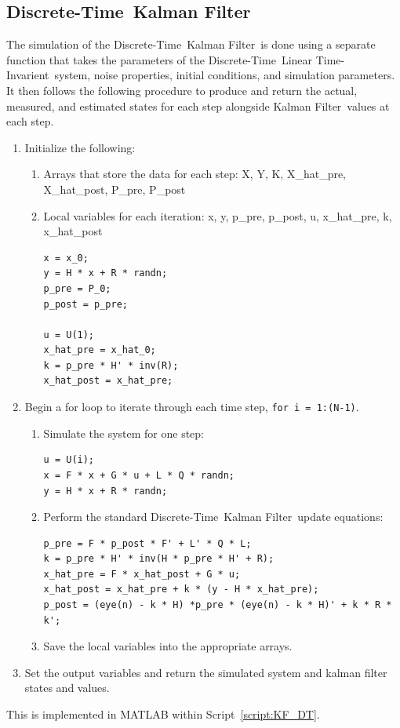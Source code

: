\documentclass[]{article}
\renewcommand{\lstlistingname}{Script}
\newcommand{\scriptname}{\lstlistingname}
\newcommand{\KF}{Kalman Filter}
\newcommand{\DT}{Discrete-Time}
\newcommand{\DTKF}{\DT \ \KF}
\newcommand{\LTI}{Linear Time-Invarient}
\begin{document}
	\subsection{\DTKF}\label{sec:DTKF}
		The simulation of the \DTKF \ is done using a separate function that takes the parameters of the \DT \ \LTI \ system, noise properties, initial conditions, and simulation parameters. It then follows the following procedure to produce and return the actual, measured, and estimated states for each step alongside \KF \ values at each step.
		\begin{enumerate}
			\item Initialize the following:
				\begin{enumerate}
					\item Arrays that store the data for each step: X, Y, K, X\_hat\_pre, X\_hat\_post, P\_pre, P\_post\\
					\item Local variables for each iteration: x, y, p\_pre, p\_post, u, x\_hat\_pre, k, x\_hat\_post
\begin{lstlisting}
x = x_0;
y = H * x + R * randn;
p_pre = P_0;
p_post = p_pre;

u = U(1);
x_hat_pre = x_hat_0;
k = p_pre * H' * inv(R);
x_hat_post = x_hat_pre;
\end{lstlisting}
				\end{enumerate}
			\item Begin a for loop to iterate through each time step, \lstinline{for i = 1:(N-1)}.
				\begin{enumerate}
					\item Simulate the system for one step:
\begin{lstlisting}
u = U(i);
x = F * x + G * u + L * Q * randn;
y = H * x + R * randn;
\end{lstlisting}
					\item Perform the standard \DTKF \ update equations:
\begin{lstlisting}
p_pre = F * p_post * F' + L' * Q * L;
k = p_pre * H' * inv(H * p_pre * H' + R);
x_hat_pre = F * x_hat_post + G * u;
x_hat_post = x_hat_pre + k * (y - H * x_hat_pre);
p_post = (eye(n) - k * H) *p_pre * (eye(n) - k * H)' + k * R * k';
\end{lstlisting}
					\item Save the local variables into the appropriate arrays.
				\end{enumerate}
			\item Set the output variables and return the simulated system and kalman filter states and values.
		\end{enumerate}
	This is implemented in MATLAB within \scriptname \ \ref{script:KF_DT}.
	
\end{document}
